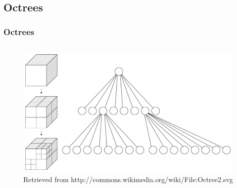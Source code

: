 \subsection{Octrees}

\begin{frame}
\frametitle{Octrees}
\begin{columns}[c]




\begin{figure}
\centering
\includegraphics[width=\textwidth]{Images/Attribute/Octree/Octree2.pdf}
\caption{Retrieved from http://commons.wikimedia.org/\allowbreak wiki/\allowbreak File:Octree2.svg}
\end{figure}


\end{columns}
\end{frame}
